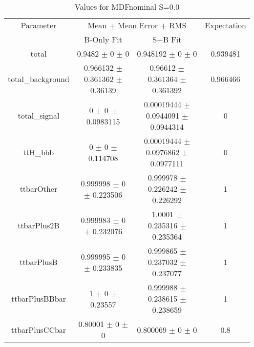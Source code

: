 \begin{table}
\centering
\caption{Values for MDFnominal S=0.0}
\begin{tabular}{cccc}
\toprule
Parameter & \multicolumn{2}{c}{Mean $\pm$ Mean Error $\pm$ RMS} & Expectation\\
 & B-Only Fit & S+B Fit & \\
\midrule
total & \num{0.9482} $\pm$ \num{0} $\pm$ \num{0} & \num{0.948192} $\pm$ \num{0} $\pm$ \num{0} & \num{0.939481}\\
total\_background & \num{0.966132} $\pm$ \num{0.361362} $\pm$ \num{0.36139} & \num{0.96612} $\pm$ \num{0.361364} $\pm$ \num{0.361392} & \num{0.966466}\\
total\_signal & \num{0} $\pm$ \num{0} $\pm$ \num{0.0983115} & \num{0.00019444} $\pm$ \num{0.0944091} $\pm$ \num{0.0944314} & \num{0}\\
ttH\_hbb & \num{0} $\pm$ \num{0} $\pm$ \num{0.114708} & \num{0.00019444} $\pm$ \num{0.0976862} $\pm$ \num{0.0977111} & \num{0}\\
ttbarOther & \num{0.999998} $\pm$ \num{0} $\pm$ \num{0.223506} & \num{0.999978} $\pm$ \num{0.226242} $\pm$ \num{0.226292} & \num{1}\\
ttbarPlus2B & \num{0.999983} $\pm$ \num{0} $\pm$ \num{0.232076} & \num{1.0001} $\pm$ \num{0.235316} $\pm$ \num{0.235364} & \num{1}\\
ttbarPlusB & \num{0.999995} $\pm$ \num{0} $\pm$ \num{0.233835} & \num{0.999865} $\pm$ \num{0.237032} $\pm$ \num{0.237077} & \num{1}\\
ttbarPlusBBbar & \num{1} $\pm$ \num{0} $\pm$ \num{0.23557} & \num{0.999988} $\pm$ \num{0.238615} $\pm$ \num{0.238659} & \num{1}\\
ttbarPlusCCbar & \num{0.80001} $\pm$ \num{0} $\pm$ \num{0} & \num{0.800069} $\pm$ \num{0} $\pm$ \num{0} & \num{0.8}\\
\bottomrule
\end{tabular}
\end{table}